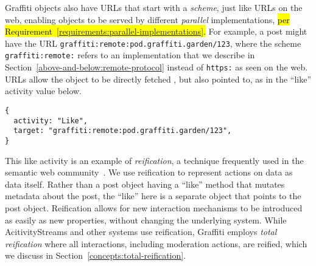 Graffiti objects also have URLs that
start with a \emph{scheme}, just like URLs on the web,
enabling objects to be served by different \emph{parallel} implementations,
\hl{%
per Requirement~{\ref{requirements:parallel-implementations}}.
}%
For example, a post might have the URL
\texttt{graffiti:\allowbreak{}remote:\allowbreak{}pod.\allowbreak{}graffiti.\allowbreak{}garden/\allowbreak{}123},
where the scheme \texttt{graffiti:\allowbreak{}remote:} refers to an implementation that we describe
in Section~\ref{above-and-below:remote-protocol}
instead of \texttt{https:} as seen on the web.
URLs allow the object to be directly fetched%
, but also pointed to, as in the
``like'' activity value below.


\begin{verbatim}
{
  activity: "Like",
  target: "graffiti:remote:pod.graffiti.garden/123",
}
\end{verbatim}

This like activity is an example of \emph{reification},
a technique frequently used in the semantic web community~\cite{rdfprimer}.   We use reification to represent actions on data as data itself.
Rather than a post object having a ``like'' method that mutates metadata about the post,
the ``like'' here is a separate object that points to the post object.
Reification allows for new interaction mechanisms to be introduced as easily as new properties,
without changing the underlying system.
While AcitivityStreams and other systems use reification,
Graffiti employs \emph{total reification} where
all interactions, including moderation actions, are reified,
which we discuss in
Section~\ref{concepts:total-reification}.

